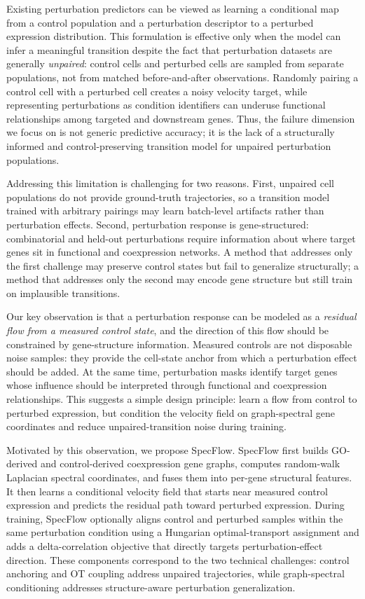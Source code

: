 \documentclass[11pt]{article}
\newcommand{\method}{SpecFlow}
\begin{document}
Existing perturbation predictors can be viewed as learning a conditional map from a control population and a perturbation descriptor to a perturbed expression distribution.
This formulation is effective only when the model can infer a meaningful transition despite the fact that perturbation datasets are generally \emph{unpaired}: control cells and perturbed cells are sampled from separate populations, not from matched before-and-after observations.
Randomly pairing a control cell with a perturbed cell creates a noisy velocity target, while representing perturbations as condition identifiers can underuse functional relationships among targeted and downstream genes.
Thus, the failure dimension we focus on is not generic predictive accuracy; it is the lack of a structurally informed and control-preserving transition model for unpaired perturbation populations.

Addressing this limitation is challenging for two reasons.
First, unpaired cell populations do not provide ground-truth trajectories, so a transition model trained with arbitrary pairings may learn batch-level artifacts rather than perturbation effects.
Second, perturbation response is gene-structured: combinatorial and held-out perturbations require information about where target genes sit in functional and coexpression networks.
A method that addresses only the first challenge may preserve control states but fail to generalize structurally; a method that addresses only the second may encode gene structure but still train on implausible transitions.

Our key observation is that a perturbation response can be modeled as a \emph{residual flow from a measured control state}, and the direction of this flow should be constrained by gene-structure information.
Measured controls are not disposable noise samples: they provide the cell-state anchor from which a perturbation effect should be added.
At the same time, perturbation masks identify target genes whose influence should be interpreted through functional and coexpression relationships.
This suggests a simple design principle: learn a flow from control to perturbed expression, but condition the velocity field on graph-spectral gene coordinates and reduce unpaired-transition noise during training.

Motivated by this observation, we propose \method{}.
\method{} first builds GO-derived and control-derived coexpression gene graphs, computes random-walk Laplacian spectral coordinates, and fuses them into per-gene structural features.
It then learns a conditional velocity field that starts near measured control expression and predicts the residual path toward perturbed expression.
During training, \method{} optionally aligns control and perturbed samples within the same perturbation condition using a Hungarian optimal-transport assignment and adds a delta-correlation objective that directly targets perturbation-effect direction.
These components correspond to the two technical challenges: control anchoring and OT coupling address unpaired trajectories, while graph-spectral conditioning addresses structure-aware perturbation generalization.
\end{document}
